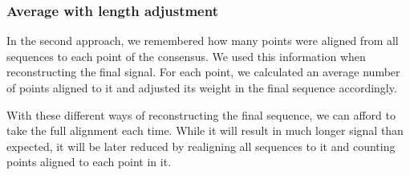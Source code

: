 \subsubsection{Average with length adjustment}
In the second approach, we remembered how many points were aligned from all sequences to each point of the consensus. We used
this information when reconstructing the final signal. For each point, we calculated an average number of points aligned to it and adjusted its weight in the final sequence accordingly.

With these different ways of reconstructing the final sequence, we can afford to take the full alignment each time. 
While it will result in much longer signal than expected, it will be later reduced by realigning all sequences to it and counting 
points aligned to each point in it.